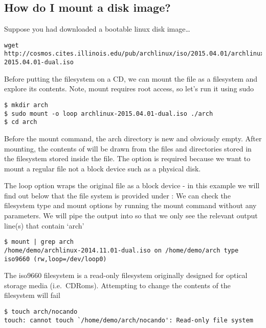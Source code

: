 \subsection{How do I mount a disk image?}\label{how-do-i-mount-a-disk-image}

Suppose you had downloaded a bootable linux disk image\ldots{}

\begin{lstlisting}
wget http://cosmos.cites.illinois.edu/pub/archlinux/iso/2015.04.01/archlinux-2015.04.01-dual.iso
\end{lstlisting}

Before putting the filesystem on a CD, we can mount the file as a filesystem and explore its contents. Note, mount requires root access, so let's run it using sudo

\begin{lstlisting}
$ mkdir arch
$ sudo mount -o loop archlinux-2015.04.01-dual.iso ./arch
$ cd arch
\end{lstlisting}

Before the mount command, the arch directory is new and obviously empty. After mounting, the contents of  will be drawn from the files and directories stored in the filesystem stored inside the  file. The  option is required because we want to mount a regular file not a block device such as a physical disk.

The loop option wraps the original file as a block device - in this example we will find out below that the file system is provided under  : We can check the filesystem type and mount options by running the mount command without any parameters. We will pipe the output into  so that we only see the relevant output line(s) that contain `arch'

\begin{lstlisting}
$ mount | grep arch
/home/demo/archlinux-2014.11.01-dual.iso on /home/demo/arch type iso9660 (rw,loop=/dev/loop0)
\end{lstlisting}

The iso9660 filesystem is a read-only filesystem originally designed for optical storage media (i.e.~CDRoms). Attempting to change the contents of the filesystem will fail

\begin{lstlisting}
$ touch arch/nocando
touch: cannot touch `/home/demo/arch/nocando': Read-only file system
\end{lstlisting}

